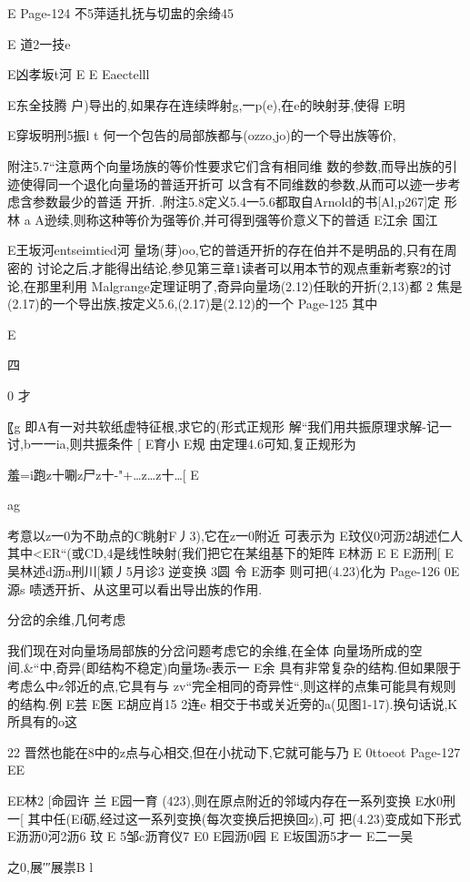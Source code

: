 {{E
Page-124
不5萍适扎抚与切盅的余绮45

E
道2一技e

E凶孝坂t河
E
E
Eaectelll

E东全技腾
户)导出的,如果存在连续晔射g,一p(e),在e的映射芽,使得
E明

E穿坂明刑5振l
t
何一个包告的局部族都与(ozzo,jo)的一个导出族等价,

附注5.7“注意两个向量场族的等价性要求它们含有相同维
数的参数,而导出族的引迹使得同一个退化向量场的普适开折可
以含有不同维数的参数,从而可以迹一步考虑含参数最少的普适
开折.
.附注5.8定义5.4一5.6都取自Arnold的书[Al,p267]定
形林
a
A逊续,则称这种等价为强等价,并可得到强等价意义下的普适
E江余
国江

E王坂河entseimtied河
量场(芽)oo,它的普适开折的存在伯并不是明品的,只有在周密的
讨论之后,才能得出结论,参见第三章$1

读者可以用本节的观点重新考察$2的讨论,在那里利用
Malgrange定理证明了,奇异向量场(2.12)任耿的开折(2,13)都
2
焦是(2.17)的一个导出族,按定义5.6,(2.17)是(2.12)的一个
Page-125
其中

E

四

0
才

〖g
即A有一对共软纸虚特征根,求它的(形式正规形
解“我们用共振原理求解-记一讨,b一一ia,则共振条件
[
E育小
E规
由定理4.6可知,复正规形为

羞=i跑z十唰z尸z十-"+…z…z十…[
E

ag

考意以z一0为不助点的C眺射F丿3),它在z一0附近
可表示为
E玟仪0河沥2胡述仁人
其中<ER“(或CD,4是线性映射(我们把它在某组基下的矩阵
E林沥
E
E
E沥刑[
E吴林述d沥a刑川[颖丿5月诊3
逆变换
3圆
令
E沥李
则可把(4.23)化为
Page-126
0E源s
啧透开折、从这里可以看出导出族的作用.

分岔的余维,几何考虑

我们现在对向量场局部族的分岔问题考虑它的余维,在全体
向量场所成的空间.&“中,奇异(即结构不稳定)向量场e表示一
E余
具有非常复杂的结构.但如果限于考虑么中z邻近的点,它具有与
zv“完全相同的奇异性“,则这样的点集可能具有规则的结构.例
E芸
E医
E胡应肖15
2连e
相交于书或关近旁的a(见图1-17).换句话说,K所具有的o这

22
晋然也能在8中的z点与心相交,但在小扰动下,它就可能与乃
E
0ttoeot
Page-127
EE

EE林2
[命园许
兰
E园一育
(423),则在原点附近的邻域内存在一系列变换
E水0刑一[
其中任(Ef砺,经过这一系列变换(每次变换后把换回z),可
把(4.23)变成如下形式
E沥沥0河2沥6
玟
E
5邹c沥育仪7
E0
E园沥0园
E
E坂国沥5才一
E二一吴

之0,展′″展祟B
l

}}
